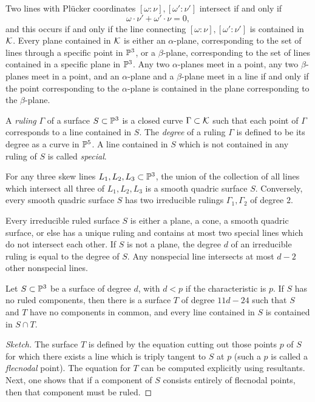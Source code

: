 \begin{prop} Two lines with Pl\"ucker coordinates $[\omega:\nu], [\omega':\nu']$ intersect if and only if
\[
\omega\cdot\nu' + \omega'\cdot\nu = 0,
\]
and this occurs if and only if the line connecting $[\omega:\nu], [\omega':\nu']$ is contained in $\mathcal{K}$. Every plane contained in $\mathcal{K}$ is either an $\alpha$-plane, corresponding to the set of lines through a specific point in $\mathbb{P}^3$, or a $\beta$-plane, corresponding to the set of lines contained in a specific plane in $\mathbb{P}^3$. Any two $\alpha$-planes meet in a point, any two $\beta$-planes meet in a point, and an $\alpha$-plane and a $\beta$-plane meet in a line if and only if the point corresponding to the $\alpha$-plane is contained in the plane corresponding to the $\beta$-plane.
\end{prop}

\begin{defn} A \emph{ruling} $\Gamma$ of a surface $S\subset \mathbb{P}^3$ is a closed curve $\Gamma\subset \mathcal{K}$ such that each point of $\Gamma$ corresponds to a line contained in $S$. The \emph{degree} of a ruling $\Gamma$ is defined to be its degree as a curve in $\mathbb{P}^5$. A line contained in $S$ which is not contained in any ruling of $S$ is called \emph{special}.
\end{defn}

\begin{prop} For any three skew lines $L_1, L_2, L_3 \subset \mathbb{P}^3$, the union of the collection of all lines which intersect all three of $L_1, L_2, L_3$ is a smooth quadric surface $S$. Conversely, every smooth quadric surface $S$ has two irreducible rulings $\Gamma_1, \Gamma_2$ of degree $2$.
\end{prop}

\begin{cor} Every irreducible ruled surface $S$ is either a plane, a cone, a smooth quadric surface, or else has a unique ruling and contains at most two special lines which do not intersect each other. If $S$ is not a plane, the degree $d$ of an irreducible ruling is equal to the degree of $S$. Any nonspecial line intersects at most $d-2$ other nonspecial lines.
\end{cor}

\begin{thm}\label{salmon} Let $S\subset \mathbb{P}^3$ be a surface of degree $d$, with $d < p$ if the characteristic is $p$. If $S$ has no ruled components, then there is a surface $T$ of degree $11d-24$ such that $S$ and $T$ have no components in common, and every line contained in $S$ is contained in $S\cap T$.
\end{thm}
\begin{proof}[Sketch] The surface $T$ is defined by the equation cutting out those points $p$ of $S$ for which there exists a line which is triply tangent to $S$ at $p$ (such a $p$ is called a \emph{flecnodal} point). The equation for $T$ can be computed explicitly using resultants. Next, one shows that if a component of $S$ consists entirely of flecnodal points, then that component must be ruled.
\end{proof}

